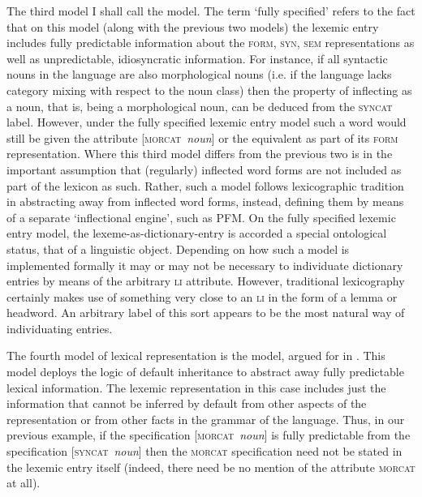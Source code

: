 \documentclass[output=paper]{langsci/langscibook}
\begin{document}
The third model I shall call the  model. The term `fully specified' refers to the fact that on this   model (along with  the previous two models)  the lexemic entry includes fully predictable information about the \textsc{form}, \textsc{syn}, \textsc{sem} representations as well as unpredictable, idiosyncratic information. For instance, if all syntactic nouns in the language are also morphological nouns (i.e. if the language lacks category mixing with respect to the noun class) then the property of inflecting as a noun, that is, being a morphological noun, can be deduced from the \textsc{syncat} label. However, under the fully specified lexemic entry model such a word would still be given the attribute [\textsc{morcat}~\textit{noun}] or the equivalent as part of its \textsc{form} representation. Where this third model differs from the previous two is in the important assumption that (regularly) inflected word forms are not included as part of the lexicon as such. Rather, such a model follows lexicographic tradition in abstracting away from inflected word forms, instead, defining  them by means of a separate `inflectional engine', such as PFM. On the fully specified lexemic entry model, the lexeme-as-dictionary-entry is accorded a special ontological status, that of a linguistic object. Depending on how such a model is implemented formally it may or may not be necessary to individuate dictionary entries by means of the arbitrary \textsc{li} attribute. However, traditional lexicography certainly makes use of something very close to an \textsc{li} in the form of a lemma or headword. An arbitrary label of this sort  appears to be the most natural way of individuating entries.

The fourth model of lexical representation is the  model, argued for in %
\citet{Spencer13}%
%
. This model deploys the logic of default inheritance to abstract away fully predictable lexical information. The lexemic representation in this case includes just the information that cannot be inferred by default from other aspects of the representation or from other facts in the grammar of the language. Thus, in our previous example, if the specification [\textsc{morcat}~\textit{noun}] is fully predictable from the specification [\textsc{syncat}~\textit{noun}] then the \textsc{morcat} specification need not be stated in the lexemic entry itself (indeed, there need be no mention of the attribute \textsc{morcat} at all).
\end{document}
